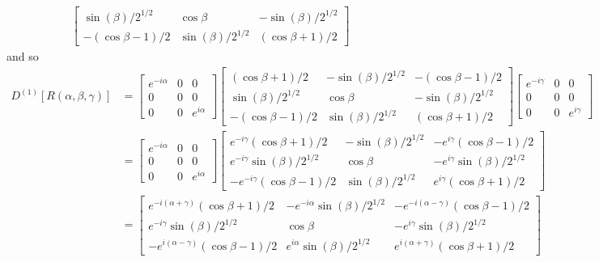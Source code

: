 \documentclass[../principles-of-quantum-mechanics.tex]{subfiles}
\begin{document}
\begin{questions}
\begin{solution}
\begin{align*}
\begin{bmatrix}
				\sin(\beta)/2^{1/2} & \cos\beta & -\sin(\beta)/2^{1/2} \\
				-(\cos\beta - 1)/2 & \sin(\beta)/2^{1/2} & (\cos\beta + 1)/2
				\end{bmatrix}
			\end{align*}
			and so
			\begin{align*}
				D^{(1)}[R(\alpha, \beta, \gamma)] &= \begin{bmatrix}e^{-i\alpha} & 0 & 0 \\ 0 & 0 & 0 \\ 0 & 0 & e^{i\alpha}\end{bmatrix}\begin{bmatrix}
					(\cos\beta + 1)/2 & -\sin(\beta)/2^{1/2} & -(\cos\beta - 1)/2 \\
					\sin(\beta)/2^{1/2} & \cos\beta & -\sin(\beta)/2^{1/2} \\
					-(\cos\beta - 1)/2 & \sin(\beta)/2^{1/2} & (\cos\beta + 1)/2
				\end{bmatrix}\begin{bmatrix}e^{-i\gamma} & 0 & 0 \\ 0 & 0 & 0 \\ 0 & 0 & e^{i\gamma}\end{bmatrix} \\
				&= \begin{bmatrix}e^{-i\alpha} & 0 & 0 \\ 0 & 0 & 0 \\ 0 & 0 & e^{i\alpha}\end{bmatrix}\begin{bmatrix}e^{-i\gamma}(\cos\beta+ 1)/2 & -\sin(\beta)/2^{1/2} & -e^{i\gamma}(\cos\beta - 1)/2 \\
				e^{-i\gamma}\sin(\beta)/2^{1/2} & \cos\beta & -e^{i\gamma}\sin(\beta)/2^{1/2} \\
			-e^{-i\gamma}(\cos\beta - 1)/2 & \sin(\beta)/2^{1/2} & e^{i\gamma}(\cos\beta + 1)/2\end{bmatrix} \\
				&= \begin{bmatrix}
					e^{-i(\alpha + \gamma)}(\cos\beta + 1)/2 & -e^{-i\alpha}\sin(\beta)/2^{1/2} & -e^{-i(\alpha - \gamma)}(\cos\beta - 1)/2 \\
					e^{-i\gamma}\sin(\beta)/2^{1/2} & \cos\beta & -e^{i\gamma}\sin(\beta)/2^{1/2} \\
					-e^{i(\alpha - \gamma)}(\cos\beta - 1)/2 & e^{i\alpha}\sin(\beta)/2^{1/2} & e^{i(\alpha + \gamma)}(\cos\beta + 1)/2
					\end{bmatrix} \\

\end{align*}
\end{solution}
\end{questions}
\end{document}
